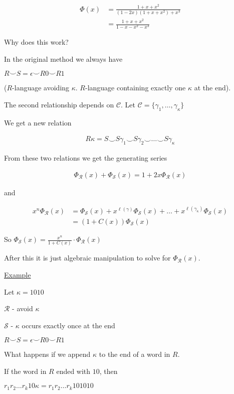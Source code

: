 \documentclass{article}
\newcommand\mc{\mathcal}
\begin{document}
\begin{align*}
    \Phi(x) &= \frac{1+x+x^2}{(1-2x)(1+x+x^2)+x^3} \\
    &= \frac{1+x+x^2}{1-x-x^2-x^3}
\end{align*}

Why does this work? 

In the original method we always have

$R \smile S = \epsilon \smile R0 \smile R1$

($R$-language avoiding $\kappa$. $R$-language containing exactly one $\kappa$ at the end).

The second relationship depends on $\mc{C}$. Let $\mc{C} = \{\gamma_1, \ldots, \gamma_{\kappa}\}$

We get a new relation 

\begin{align*}
    R\kappa = S \smile S\gamma_1 \smile S\gamma_2 \smile \ldots \smile S\gamma_{\kappa}
\end{align*}

From these two relations we get the generating series

\begin{align*}
    \Phi_{\mc{R}}(x) + \Phi_{\mc{S}}(x) = 1 + 2x \Phi_{\mc{R}}(x)
\end{align*}

and 

\begin{align*}
    x^n \Phi_{\mc{R}}(x) &= \Phi_{\mc{S}}(x) + x^{\ell(\gamma)} \Phi_{\mc{S}}(x) + \ldots + x^{\ell(\gamma_\kappa)} \Phi_{\mc{S}}(x) \\
    &= (1 + C(x)) \Phi_{\mc{S}}(x)
\end{align*}

So $\Phi_{\mc{S}}(x) = \frac{x^n}{1+C(x)} \cdot \Phi_{\mc{R}}(x)$

After this it is just algebraic manipulation to solve for $\Phi_{\mc{R}}(x)$.

\underline{Example}

Let $\kappa = 1010$

$\mc{R}$ - avoid $\kappa$

$\mc{S}$ - $\kappa$ occurs exactly once at the end

$R \smile S = \epsilon \smile R0 \smile R1$

What happens if we append $\kappa$ to the end of a word in $R$.

If the word in $R$ ended with $10$, then

$r_1r_2 \ldots r_k 10 \kappa = r_1r_2 \ldots r_k 101010$
\end{document}

